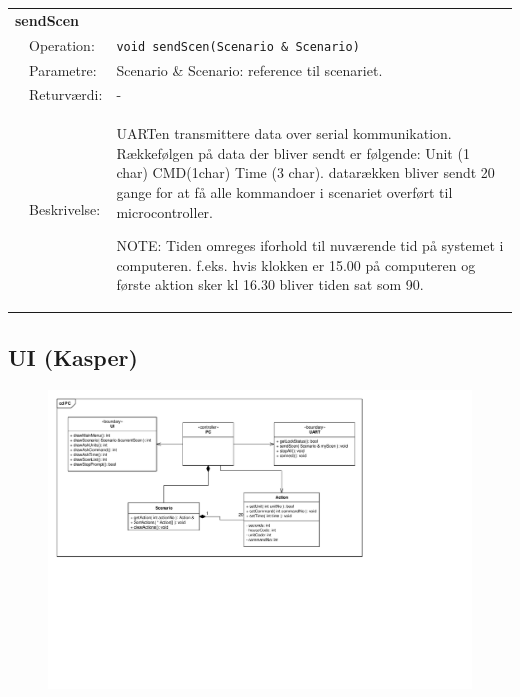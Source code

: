\begin{table}[h]
\begin{tabularx}{\textwidth}{p{0.6 cm} l X} %
\multicolumn{3}{l}{\textbf{sendScen}}\\
& Operation: & 
\texttt{void sendScen(Scenario \& Scenario)}
\\ & Parametre: & 
 Scenario \& Scenario: reference til scenariet.
\\ & Returværdi: & 
-
\\ & Beskrivelse: & 
UARTen transmittere data over serial kommunikation. Rækkefølgen på data der bliver sendt er følgende:
Unit (1 char) \- CMD(1char) \- Time (3 char).
datarækken bliver sendt 20 gange for at få alle kommandoer i scenariet overført til microcontroller. 		

NOTE: Tiden omreges iforhold til nuværende tid på systemet i computeren.
f.eks. hvis klokken er 15.00 på computeren og første aktion sker kl 16.30 bliver tiden sat som 90.

\\ \end{tabularx}
\end{table}

\clearpage

\subsection{UI (Kasper)}
 
\begin{figure}[h]
\centering
\includegraphics[scale=1,clip=true, trim=38 433 625 50]{../Projektdokumentation/Systemarkitektur/diagrammer/PC_KlasseDiagram} %
\end{figure}

